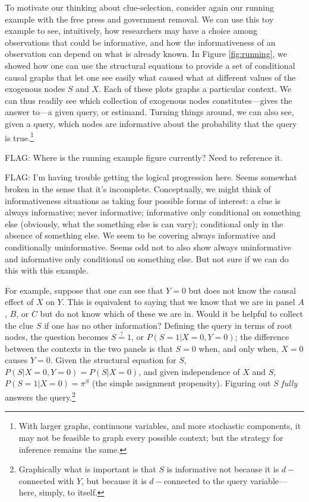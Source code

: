 \documentclass[12pt,]{book}
\let\rmarkdownfootnote\footnote%
\def\footnote{\protect\rmarkdownfootnote}
\begin{document}
To motivate our thinking about clue-selection, consider again our running example with the free press and government removal. We can use this toy example to see, intuitively, how researchers may have a choice among observations that could be informative, and how the informativeness of an observation can depend on what is already known. In Figure \ref{fig:running}, we showed how one can use the structural equations to provide a set of conditional causal graphs that let one see easily what caused what at different values of the exogenous nodes \(S\) and \(X\). Each of these plots graphs a particular context. We can thus readily see which collection of exogenous nodes constitutes---gives the answer to---a given query, or estimand. Turning things around, we can also see, given a query, which nodes are informative about the probability that the query is true.\footnote{With larger graphs, continuous variables, and more stochastic components, it may not be feasible to graph every possible context; but the strategy for inference remains the same.}

FLAG: Where is the running example figure currently? Need to reference it.

FLAG: I'm having trouble getting the logical progression here. Seems somewhat broken in the sense that it's incomplete. Conceptually, we might think of informativeness situations as taking four possible forms of interest: a clue is always informative; never informative; informative only conditional on something else (obviously, what the something else is can vary); conditional only in the absence of something else. We seem to be covering always informative and conditionally uninformative. Seems odd not to also show always uninformative and informative only conditional on something else. But not sure if we can do this with this example.

For example, suppose that one can see that \(Y=0\) but does not know the causal effect of \(X\) on \(Y\). This is equivalent to saying that we know that we are in panel \(A\), \(B\), or \(C\) but do not know which of these we are in. Would it be helpful to collect the clue \(S\) if one has no other information? Defining the query in terms of root nodes, the question becomes \(S \stackrel{?}{=} 1\), or \(P(S=1|X=0,Y=0)\); the difference between the contexts in the two panels is that \(S=0\) when, and only when, \(X=0\) causes \(Y=0\). Given the structural equation for \(S\), \(P(S|X=0,Y=0) = P(S|X=0)\), and given independence of \(X\) and \(S\), \(P(S=1|X=0)= \pi^S\) (the simple assignment propensity). Figuring out \(S\) \emph{fully} answers the query.\footnote{Graphically what is important is that \(S\) is informative not because it is \(d-\)connected with \(Y\), but because it is \(d-\)connected to the query variable---here, simply, to itself.}
\end{document}
